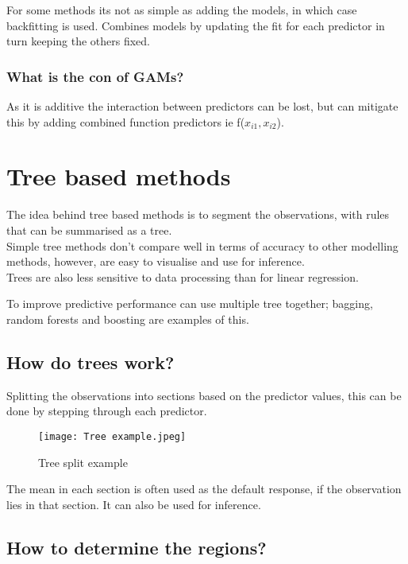 \documentclass[11pt]{scrartcl} %
\begin{document}
For some methods its not as simple as adding the models, in which case backfitting is used.
Combines models by updating the fit for each predictor in turn keeping the others fixed.

\subsubsection{What is the con of GAMs?}

As it is additive the interaction between predictors can be lost, but can mitigate this by adding
combined function predictors ie f(\(x_{i1},x_{i2}\)).

\section{Tree based methods}

The idea behind tree based methods is to segment the observations, with rules that can be summarised
as a tree. \\

Simple tree methods don't compare well in terms of accuracy to other modelling methods, however, are easy
to visualise and use for inference.\\

Trees are also less sensitive to data processing than for linear regression.

To improve predictive performance can use multiple tree together; bagging, random forests and boosting
are examples of this.

\subsection{How do trees work?}

Splitting the observations into sections based on the predictor values, this can be done by stepping
through each predictor.

\begin{figure}[h] %
	\centering
	\texttt{[image: Tree example.jpeg]} %
	\caption{Tree split example}
\end{figure}

The mean in each section is often used as the default response, if the observation lies in that section.
It can also be used for inference.

\subsection{How to determine the regions?}
\end{document}
